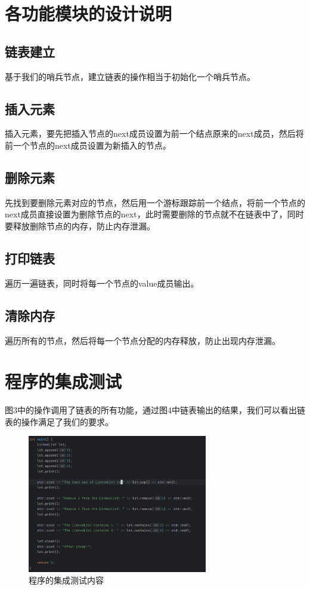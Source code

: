 \documentclass{ctexart}
\begin{document}
    
    
    \section{各功能模块的设计说明}
    \subsection{链表建立}
    基于我们的哨兵节点，建立链表的操作相当于初始化一个哨兵节点。
    
    \subsection{插入元素}
    插入元素，要先把插入节点的next成员设置为前一个结点原来的next成员，然后将前一个节点的next成员设置为新插入的节点。
    
    \subsection{删除元素}
    先找到要删除元素对应的节点，然后用一个游标跟踪前一个结点，将前一个节点的next成员直接设置为删除节点的next，此时需要删除的节点就不在链表中了，同时要释放删除节点的内存，防止内存泄漏。
    
    
    \subsection{打印链表}
    遍历一遍链表，同时将每一个节点的value成员输出。
    
    \subsection{清除内存}
    遍历所有的节点，然后将每一个节点分配的内存释放，防止出现内存泄漏。
    
    \section{程序的集成测试}
    图3中的操作调用了链表的所有功能，通过图4中链表输出的结果，我们可以看出链表的操作满足了我们的要求。
    \begin{figure}[h] %
       \centering
       \includegraphics[width=0.7\textwidth]{test1.png}
       \caption{程序的集成测试内容}
    \end{figure}
    
\end{document}
